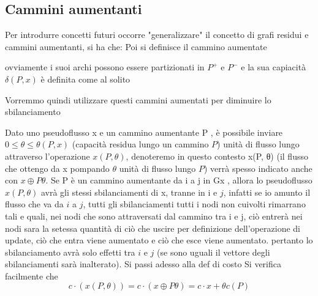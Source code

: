 \subsection{Cammini aumentanti}
Per introdurre concetti futuri occorre "generalizzare" il concetto di grafi residui e cammini aumentanti, si ha che:
Poi si definisce il cammino aumentate 

ovviamente i suoi archi possono essere partizionati in $P^+$ e $P^-$ e la sua capiacità $\delta(P,x)$ è definita come al solito


  Vorremmo quindi utilizzare questi cammini aumentati per diminuire lo sbilanciamento 

  Dato uno pseudoflusso x e un cammino aumentante P , è
  possibile inviare $0 ≤ θ ≤ θ(P, x)$ (capacità residua lungo un cammino $P$) unità di flusso lungo attraverso l’operazione $x(P, θ)$, denoteremo in questo contesto x(P, θ) (il flusso che ottengo da x pompando $\theta$ unità di flusso lungo $P$) verrà spesso indicato anche con $x ⊕ P θ$. Se P è un cammino aumentante da i a j in Gx , allora lo pseudoflusso $x(P, θ)$ avrà gli stessi sbilanciamenti di x, tranne in i e $j$, infatti se io amunto il flusso che va da $i$  a $j$, tutti gli sbilanciamenti tutti i nodi non cuivolti rimarrano tali e quali, nei nodi che sono attraversati dal cammino tra i e j, ciò entrerà nei nodi sara la setessa quantità di ciò che uscire per definizione dell'operazione di update, ciò che entra viene aumentato e ciò che esce viene aumentato. pertanto lo sbilanciamento avrà solo effetti tra $i$ e $j$ (se sono uguali il vettore degli sbilanciamenti sarà inalterato). Si passi adesso alla def di costo
  Si verifica facilmente che 
  \[
    c · (x(P, θ)) = c · (x ⊕ P θ) = c · x + θc(P )
  \]


